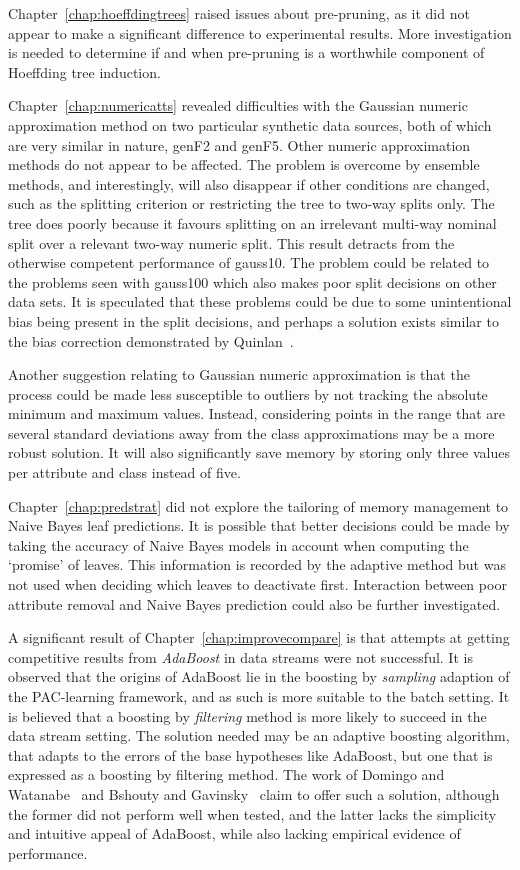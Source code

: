 Chapter~\ref{chap:hoeffdingtrees} raised issues about pre-pruning, as it did not appear to make a significant difference to experimental results. More investigation is needed to determine if and when pre-pruning is a worthwhile component of Hoeffding tree induction.

Chapter~\ref{chap:numericatts} revealed difficulties with the Gaussian numeric approximation method on two particular synthetic data sources, both of which are very similar in nature, {\sc genF2} and {\sc genF5}. Other numeric approximation methods do not appear to be affected. The problem is overcome by ensemble methods, and interestingly, will also disappear if other conditions are changed, such as the splitting criterion or restricting the tree to two-way splits only. The tree does poorly because it favours splitting on an irrelevant multi-way nominal split over a relevant two-way numeric split. This result detracts from the otherwise competent performance of {\sc gauss10}. The problem could be related to the problems seen with {\sc gauss100} which also makes poor split decisions on other data sets. It is speculated that these problems could be due to some unintentional bias being present in the split decisions, and perhaps a solution exists similar to the bias correction demonstrated by Quinlan~\cite{c4.5rel8}.

Another suggestion relating to Gaussian numeric approximation is that the process could be made less susceptible to outliers by not tracking the absolute minimum and maximum values. Instead, considering points in the range that are several standard deviations away from the class approximations may be a more robust solution. It will also significantly save memory by storing only three values per attribute and class instead of five.

Chapter~\ref{chap:predstrat} did not explore the tailoring of memory management to Naive Bayes leaf predictions. It is possible that better decisions could be made by taking the accuracy of Naive Bayes models in account when computing the `promise' of leaves. This information is recorded by the adaptive method but was not used when deciding which leaves to deactivate first. Interaction between poor attribute removal and Naive Bayes prediction could also be further investigated.

A significant result of Chapter~\ref{chap:improvecompare} is that attempts at getting competitive results from {\em AdaBoost} in data streams were not successful. It is observed that the origins of AdaBoost lie in the boosting by {\em sampling} adaption of the PAC-learning framework, and as such is more suitable to the batch setting. It is believed that a boosting by {\em filtering} method is more likely to succeed in the data stream setting. The solution needed may be an adaptive boosting algorithm, that adapts to the errors of the base hypotheses like AdaBoost, but one that is expressed as a boosting by filtering method. The work of Domingo and Watanabe~\cite{madaboost} and Bshouty and Gavinsky~\cite{polyboost} claim to offer such a solution, although the former did not perform well when tested, and the latter lacks the simplicity and intuitive appeal of AdaBoost, while also lacking empirical evidence of performance.

